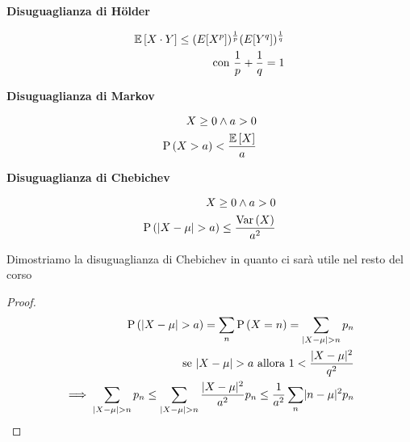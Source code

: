 


\begin{defn}
	\textbf{Disuguaglianza di Hölder}
	
	\begin{equation}
		\begin{aligned}
		\mathbb{E}\left[X \cdot Y\right] \leq (E[X^p])^{\frac{1}{p}} (E[Y^q])^{\frac{1}{q}} \\
		\text{con } \dfrac{1}{p} + \dfrac{1}{q} = 1
		\end{aligned}
	\end{equation}
\end{defn}


\begin{defn}
	\textbf{Disuguaglianza di Markov}
	
	\begin{equation}
		\begin{aligned}
		X \geq 0 \land a > 0 \\
		\text{P}\left(X > a\right) < \dfrac{\mathbb{E}\left[X\right]}{a}
		\end{aligned}
	\end{equation}
\end{defn}

\begin{defn}
	\textbf{Disuguaglianza di Chebichev}
	
	\begin{equation*}
		\begin{aligned}
			X \geq 0 \land a > 0 \\
			\text{P}\left(\lvert X - \mu\rvert > a\right) \leq \dfrac{\text{Var}\left(X\right)}{a^2}
		\end{aligned}
	\end{equation*}
	
	Dimostriamo la disuguaglianza di Chebichev in quanto ci sarà utile nel resto del corso
	
	\begin{proof}
		\begin{equation*}
			\begin{aligned}
				\text{P}\left(\lvert X - \mu\rvert > a\right) = \sum_n \text{P}\left(X = n\right) = \sum_{\lvert X - \mu\rvert > n} p_n \\
				\text{se } \lvert X - \mu\rvert > a \text{ allora } 1 < \dfrac{\lvert X - \mu\rvert^2}{q^2} \\ \implies  \sum_{\lvert X - \mu\rvert > n} p_n  \leq \sum_{\lvert X - \mu\rvert > n} \dfrac{\lvert X - \mu\rvert^2}{a^2} p_n \leq \dfrac{1}{a^2} \sum_n \lvert n - \mu\rvert^2 p_n 
			\end{aligned}
		\end{equation*}
	\end{proof}
\end{defn}



